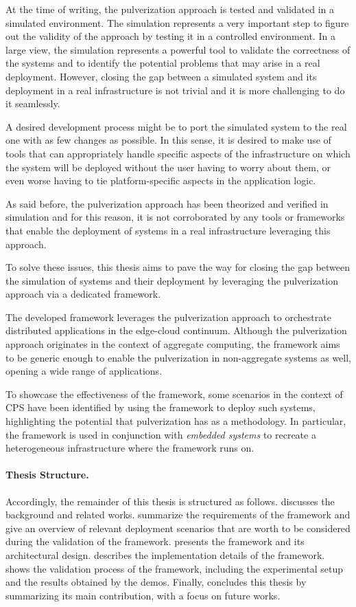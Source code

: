 At the time of writing, the pulverization approach is tested and validated in a simulated environment.
The simulation represents a very important step to figure out the validity of the approach by testing it in a controlled environment.
In a large view, the simulation represents a powerful tool to validate the correctness of the systems and to identify the
potential problems that may arise in a real deployment. However, closing the gap between a simulated system and its deployment in a real
infrastructure is not trivial and it is more challenging to do it seamlessly.

A desired development process might be to port the simulated system to the real one with as few changes as possible. In this sense, it is
desired to make use of tools that can appropriately handle specific aspects of the infrastructure on which the system will be deployed without the
user having to worry about them, or even worse having to tie platform-specific aspects in the application logic.

As said before, the pulverization approach has been theorized and verified in simulation and for this reason, it is not corroborated by any tools or
frameworks that enable the deployment of systems in a real infrastructure leveraging this approach.

To solve these issues, this thesis aims to pave the way for closing the gap between the simulation of systems and their deployment by
leveraging the pulverization approach via a dedicated framework.

The developed framework leverages the pulverization approach to orchestrate distributed applications in the edge-cloud continuum.
Although the pulverization approach originates in the context of aggregate computing, the framework aims to be generic enough to enable the
pulverization in non-aggregate systems as well, opening a wide range of applications.

To showcase the effectiveness of the framework, some scenarios in the context of CPS have been identified by using the framework to deploy such
systems, highlighting the potential that pulverization has as a methodology.
In particular, the framework is used in conjunction with \emph{embedded systems} to recreate a heterogeneous infrastructure where the framework
runs on.

%
\paragraph{Thesis Structure.} %
%
Accordingly, the remainder of this thesis is structured as follows.
%
 discusses the background and related works.
%
 summarize the requirements of the framework and give an overview of relevant deployment scenarios that are worth
to be considered during the validation of the framework.
%
 presents the framework and its architectural design.
%
 describes the implementation details of the framework.
%
 shows the validation process of the framework, including the experimental setup and the results obtained by the demos.
%
Finally,  concludes this thesis by summarizing its main contribution, with a focus on future works.